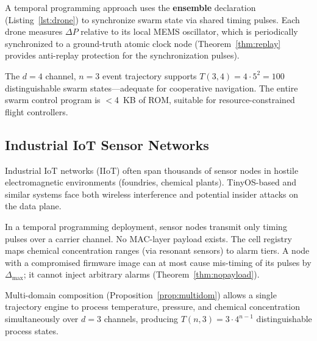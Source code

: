\documentclass[twocolumn,10pt]{article}
\newcommand{\DP}{\Delta P}          %
\begin{document}
A temporal programming approach uses the \textbf{ensemble}
declaration (Listing~\ref{lst:drone}) to synchronize swarm state
via shared timing pulses. Each drone measures $\DP$ relative to its
local MEMS oscillator, which is periodically synchronized to a
ground-truth atomic clock node (Theorem~\ref{thm:replay} provides
anti-replay protection for the synchronization pulses).

The $d=4$ channel, $n=3$ event trajectory supports
$T(3,4) = 4 \cdot 5^2 = 100$ distinguishable swarm states---adequate
for cooperative navigation. The entire swarm control program is
$<$4~KB of ROM, suitable for resource-constrained flight controllers.

\subsection{Industrial IoT Sensor Networks}

Industrial IoT networks (IIoT) often span thousands of sensor nodes
in hostile electromagnetic environments (foundries, chemical plants).
TinyOS-based \cite{levis2005tinyos} and similar systems face both
wireless interference and potential insider attacks on the data plane.

In a temporal programming deployment, sensor nodes transmit only
timing pulses over a carrier channel. No MAC-layer payload exists.
The cell registry maps chemical concentration ranges (via resonant
sensors) to alarm tiers. A node with a compromised firmware image
can at most cause mis-timing of its pulses by $\Delta_{\max}$;
it cannot inject arbitrary alarms (Theorem~\ref{thm:nopayload}).

Multi-domain composition (Proposition~\ref{prop:multidom}) allows a
single trajectory engine to process temperature, pressure, and
chemical concentration simultaneously over $d=3$ channels, producing
$T(n,3) = 3 \cdot 4^{n-1}$ distinguishable process states.
\end{document}
